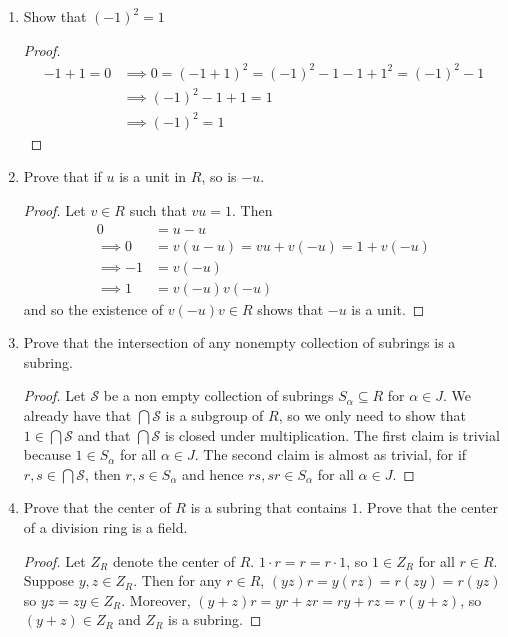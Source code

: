 \documentclass{report}
\begin{document}
\begin{enumerate}
    \item Show that $(-1)^2=1$
    \begin{proof}
        \begin{align*}
            -1+1 = 0 &\implies 0 = (-1+1)^2 = (-1)^2 -1 -1 + 1^2 = (-1)^2 -1\\
            &\implies (-1)^2 - 1 + 1 = 1\\
            &\implies (-1)^2 = 1
        \end{align*}
    \end{proof}

    
    \item Prove that if $u$ is a unit in $R$, so is $-u$.
    \begin{proof}
        Let $v\in R$ such that $vu = 1$. Then
        \begin{align*}
            0 &= u - u\\
            \implies 0 &= v(u - u) = vu + v(-u) = 1 + v(-u)\\
            \implies -1 &= v(-u)\\
            \implies 1 &= v(-u)v(-u)
        \end{align*}
        and so the existence of $v(-u)v\in R$ shows that $-u$ is a unit.
    \end{proof}

    
    \setcounter{enumi}{3}
    \item Prove that the intersection of any nonempty collection of subrings is a subring.
    \begin{proof}
        Let $\mathcal{S}$ be a non empty collection of subrings $S_\alpha\subseteq R$ for $\alpha\in J$. We already have that $\bigcap\mathcal{S}$ is a subgroup of $R$, so we only need to show that $1\in \bigcap\mathcal{S}$ and that $\bigcap\mathcal{S}$ is closed under multiplication. The first claim is trivial because $1\in S_\alpha$ for all $\alpha\in J$. The second claim is almost as trivial, for if $r,s\in\bigcap\mathcal{S}$, then $r,s\in S_\alpha$ and hence $rs,sr\in S_\alpha$ for all $\alpha\in J$.
    \end{proof}


    \setcounter{enumi}{6}
    \item Prove that the center of $R$ is a subring that contains $1$. Prove that the center of a division ring is a field.
    \begin{proof}
        Let $Z_R$ denote the center of $R$. $1\cdot r =r= r\cdot 1$, so $1\in Z_R$ for all $r\in R$. Suppose $y,z\in Z_R$. Then for any $r\in R$, $(yz)r=y(rz)=r(zy)=r(yz)$ so $yz=zy\in Z_R$. Moreover, $(y+z)r=yr+zr=ry+rz=r(y+z)$, so $(y+z)\in Z_R$ and $Z_R$ is a subring.
        \bigskip


\end{proof}
\end{enumerate}
\end{document}
